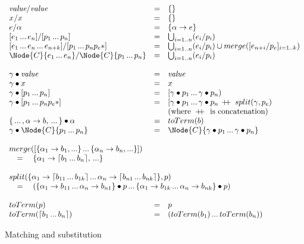 \begin{figure}[t]
\[\begin{array}{lclll}
\Match{\Value}{\Value} &=& \{\} \\
\Match{\VarX}{\VarX} &=& \{\} \\
\Match{e}{\PVarA} &=& \{\PVarA \to e\} \\
\Match{[e_1 \dd e_n]}{[p_1 \dd p_n]} &=&
  \bigcup_{i=1..n} (\Match{e_i}{p_i}) \\
\Match{[e_1 \dd e_n \dd e_{n+k}]}{[p_1 \dd p_n \Ell{p_e}]} &=&
  \bigcup_{i=1..n} (\Match{e_i}{p_i}) \cup
  merge([\Match{e_{n+i}}{p_e}]_{i=1..k}) \\
\Match{\Node{C}{e_1 \dd e_n}}{\Node{C}{p_1 \dd p_n}} &=&
  \bigcup_{i=1..n} (\Match{e_i}{p_i}) \\ \\

\Subs{\gamma}{\Value}        &=& \Value \\
\Subs{\gamma}{\VarX}        &=& \VarX \\
\Subs{\gamma}{[p_1 \dd p_n]}    &=& [\Subs{\gamma}{p_1} \dd \Subs{\gamma}{p_n}) \\
\Subs{\gamma}{[p_1 \dd p_n \Ell{p_e}]} &=&
  [\Subs{\gamma}{p_1} \dd \Subs{\gamma}{p_n\,\DoublePlus\,split(\gamma, p_e)} \\
    &&\text{(where } \DoublePlus \text{ is concatenation)} \\
\Subs{\{\dd,\PVarA \to b,\dd\}}{\PVarA} &=& toTerm(b) \\
\Subs{\gamma}{\Node{C}{p_1 \dd p_n}} &=&
  \Node{C}{\Subs{\gamma}{p_1} \dd \Subs{\gamma}{p_n}} \\ \\

\multicolumn{3}{l}{merge([\{\PVarA_1 \to b_1,...\} \dd \{\PVarA_n \to b_n,...\}])} \\
\multicolumn{3}{l}{\quad=\quad \{\PVarA_1 \to \BList{b_1 \dd b_n},\,...\}} \\ \\

\multicolumn{3}{l}{split(\{\PVarA_1 \to \BList{b_{11} \dd b_{1k}} \dd 
  \PVarA_n \to \BList{b_{n1} \dd b_{nk}}\}, p)} \\
\multicolumn{3}{l}{\quad=\quad
  (\Subs{\{\PVarA_1 \to b_{11} \dd  \PVarA_n \to b_{n1}\}}{p} \dd 
   \Subs{\{\PVarA_1 \to b_{1k} \dd  \PVarA_n \to b_{nk}\}}{p})} \\ \\

toTerm(p) &=& p \\
toTerm(\BList{b_1 \dd b_n}) &=&
  (toTerm(b_1) \dd toTerm(b_n))

\end{array}\]
\caption{Matching and substitution}
\label{fig:reval-formal-subs}
\end{figure}

